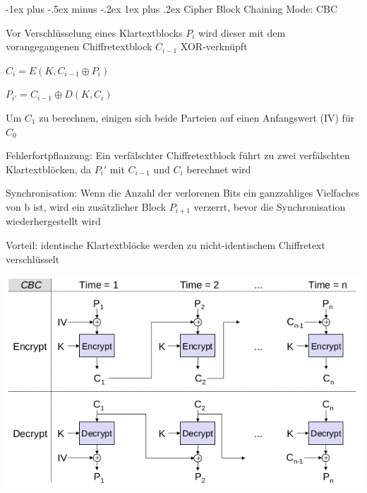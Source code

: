 \documentclass[a4paper]{article}
\makeatletter
\renewcommand{\subsubsection}{\@startsection{subsubsection}{3}{0mm}%
 {-1ex plus -.5ex minus -.2ex}%
 {1ex plus .2ex}%
 {\normalfont\small\bfseries}}
\makeatother
\begin{document}
\begin{multicols}{3}
      \subsubsection{Cipher Block Chaining Mode: CBC}
      \begin{itemize*}
            \item Vor Verschlüsselung eines Klartextblocks $P_i$ wird dieser mit dem vorangegangenen Chiffretextblock $C_{i-1}$ XOR-verknüpft
            \begin{itemize*}
                  \item $C_i = E(K, C_{i-1} \oplus P_i)$
                  \item $P_{i'} = C_{i-1} \oplus D(K, C_i)$
                  \item Um $C_1$ zu berechnen, einigen sich beide Parteien auf einen Anfangswert (IV) für $C_0$
            \end{itemize*}
            \item Fehlerfortpflanzung: Ein verfälschter Chiffretextblock führt zu zwei verfälschten Klartextblöcken, da $P_i'$ mit $C_{i-1}$ und $C_i$ berechnet wird
            \item Synchronisation: Wenn die Anzahl der verlorenen Bits ein ganzzahliges Vielfaches von b ist, wird ein zusätzlicher Block $P_{i+1}$ verzerrt, bevor die Synchronisation wiederhergestellt wird %
            \item Vorteil: identische Klartextblöcke werden zu nicht-identischem Chiffretext verschlüsselt
      \end{itemize*}
      \begin{center}
            \includegraphics[width=.6\linewidth]{Assets/NetworkSecurity-cipher-block-chaining-mode.png}
      \end{center}


\end{multicols}
\end{document}
